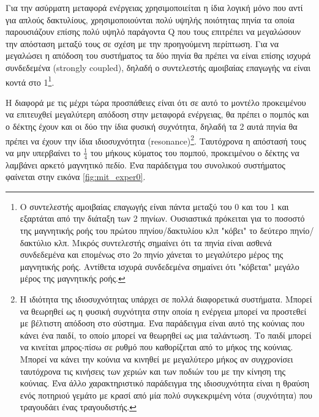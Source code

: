 Για την ασύρματη μεταφορά ενέργειας χρησιμοποιείται η ίδια λογική μόνο που αντί για απλούς δακτυλίους, χρησιμοποιούνται πολύ υψηλής ποιότητας πηνία τα οποία
παρουσιάζουν επίσης πολύ υψηλό παράγοντα Q που τους επιτρέπει να μεγαλώσουν την απόσταση μεταξύ τους σε σχέση με την προηγούμενη περίπτωση. Για να μεγαλώσει η απόδοση
του συστήματος τα δύο πηνία θα πρέπει να είναι επίσης ισχυρά συνδεδεμένα (strongly coupled), δηλαδή ο συντελεστής αμοιβαίας επαγωγής να είναι κοντά στο 1\footnote{Ο
συντελεστής αμοιβαίας επαγωγής είναι πάντα μεταξύ του 0 και του 1 και εξαρτάται από την διάταξη των 2 πηνίων. Ουσιαστικά πρόκειται για το ποσοστό της μαγνητικής ροής
του πρώτου πηνίου/δακτυλίου κλπ "κόβει" το δεύτερο πηνίο/δακτύλιο κλπ. Μικρός συντελεστής σημαίνει ότι τα πηνία είναι ασθενά συνδεδεμένα και επομένως στο 2ο πηνίο
χάνεται το μεγαλύτερο μέρος της μαγνητικής ροής. Αντίθετα ισχυρά συνδεδεμένα σημαίνει ότι "κόβεται" μεγάλο μέρος της μαγνητικής ροής.}.

Η διαφορά με τις μέχρι τώρα προσπάθειες είναι ότι σε αυτό το μοντέλο προκειμένου να επιτευχθεί μεγαλύτερη απόδοση στην μεταφορά ενέργειας, θα πρέπει ο πομπός και ο
δέκτης έχουν και οι δύο την ίδια φυσική συχνότητα, δηλαδή τα 2 αυτά πηνία θα πρέπει
να έχουν την ίδια ιδιοσυχνότητα (resonance)\footnote{Η ιδιότητα της ιδιοσυχνότητας υπάρχει σε πολλά διαφορετικά συστήματα. Μπορεί να θεωρηθεί  ως  η φυσική
συχνότητα στην οποία η ενέργεια μπορεί να προστεθεί με βέλτιστη απόδοση στο σύστημα. Ένα παράδειγμα είναι αυτό της κούνιας που κάνει ένα παιδί, το οποίο μπορεί να
θεωρηθεί ως μια ταλάντωση. Το παιδί μπορεί να κινείται μπρος-πίσω σε ρυθμό που καθορίζεται από το μήκος της κούνιας. Μπορεί να κάνει την κούνια να κινηθεί με
μεγαλύτερο μήκος αν συγχρονίσει ταυτόχρονα τις κινήσεις των χεριών και των ποδιών του με την κίνηση της κούνιας. Ένα άλλο χαρακτηριστικό παράδειγμα της ιδιοσυχνότητα
είναι η θραύση ενός ποτηριού γεμάτο με κρασί από μία πολύ συγκεκριμένη νότα (συχνότητα) που τραγουδάει ένας τραγουδιστής.}. Ταυτόχρονα η απόστασή τους να μην
υπερβαίνει το $\frac{1}{4}$ του μήκους κύματος του πομπού, προκειμένου ο δέκτης να λαμβάνει αρκετό μαγνητικό πεδίο. Ένα παράδειγμα του συνολικού συστήματος φαίνεται
στην εικόνα \ref{fig:mit_exper0}.    


